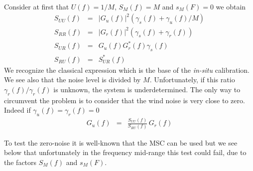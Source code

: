 Consider at first that $U(f)=1/M$, $S_M(f)=M$ and $s_{M}(F)=0$ we obtain
\begin{eqnarray*}
\label{eq:Syentries}
S_{UU}(f)&=& |G_{u}(f)|^2  (\gamma_{s}(f)+ \gamma_{u}(f) /M)
\\
S_{RR}(f)&=&|G_{r}(f)|^2 (\gamma_{s}(f)+\gamma_{r}(f))
\\
S_{UR}(f)&=& G_{u}(f)G_{r}^{*}(f) \gamma_{s}(f)
\\
S_{RU}(f)&=&S_{UR}^{*}(f)
\end{eqnarray*}
We recognize the classical expression which is the base of the {\it in-situ} calibration. We see also that the noise level is divided by $M$. Unfortunately, if  this ratio $\gamma_{r}(f)/\gamma_{r}(f)$ is unknown, the system is underdetermined. The only way to circumvent  the problem is to consider that the wind noise is very close to zero. Indeed if $\gamma_{u}(f)=\gamma_{r}(f)=0$
\begin{eqnarray*}
 G_{u}(f) &=& \frac{S_{UU}(f)}{S_{RU}(f)}\, G_{r}(f)
\end{eqnarray*}


To test the zero-noise it is well-known that the MSC can be used but we see below that unfortunately in the frequency mid-range this test could fail, due to the factors $S_M(f)$ and $s_{M}(F)$.

